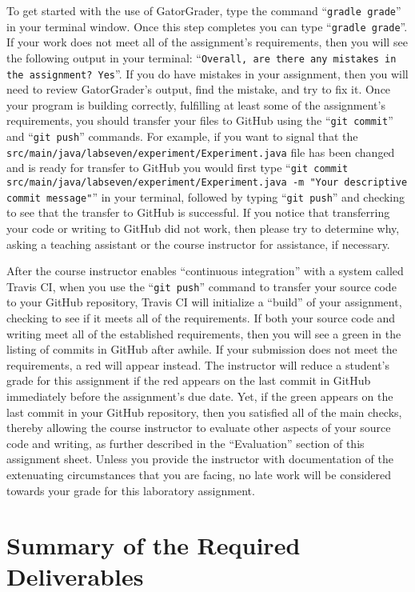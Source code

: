 \documentclass[11pt]{article}
\newcommand{\mainprogramsource}{\lstinline{src/main/java/labseven/experiment/Experiment.java}}
\newcommand{\gatorgraderstart}{\command{gradle grade}}
\newcommand{\gatorgradercheck}{\command{gradle grade}}
\newcommand{\gitcommit}{\command{git commit}}
\newcommand{\gitpush}{\command{git push}}
\newcommand{\gitcommitmainprogram}{\command{git commit src/main/java/labseven/experiment/Experiment.java -m "Your
descriptive commit message"}}
\newcommand{\command}[1]{``\lstinline{#1}''}
\newcommand{\step}[1]{``{#1}''}
\newcommand{\checkmark}{\ding{51}}
\newcommand{\naughtmark}{\ding{55}}
\begin{document}
To get started with the use of GatorGrader, type the command \gatorgraderstart{}
in your terminal window. Once this step completes you can type
\gatorgradercheck{}. If your work does not meet all of the assignment's
requirements, then you will see the following output in your terminal:
\command{Overall, are there any mistakes in the assignment? Yes}. If you do have
mistakes in your assignment, then you will need to review GatorGrader's output,
find the mistake, and try to fix it. Once your program is building correctly,
fulfilling at least some of the assignment's requirements, you should transfer
your files to GitHub using the \gitcommit{} and \gitpush{} commands. For
example, if you want to signal that the \mainprogramsource{} file has been
changed and is ready for transfer to GitHub you would first type
\gitcommitmainprogram{} in your terminal, followed by typing \gitpush{} and
checking to see that the transfer to GitHub is successful. If you notice that
transferring your code or writing to GitHub did not work, then please try to
determine why, asking a teaching assistant or the course instructor for
assistance, if necessary.

After the course instructor enables \step{continuous integration} with a system called Travis CI, when you use the
\gitpush{} command to transfer your source code to your GitHub repository, Travis CI will initialize a \step{build} of
your assignment, checking to see if it meets all of the requirements. If both your source code and writing meet all of
the established requirements, then you will see a green \checkmark{} in the listing of commits in GitHub after awhile.
If your submission does not meet the requirements, a red \naughtmark{} will appear instead. The instructor will reduce a
student's grade for this assignment if the red \naughtmark{} appears on the last commit in GitHub immediately before the
assignment's due date. Yet, if the green \checkmark{} appears on the last commit in your GitHub repository, then you
satisfied all of the main checks, thereby allowing the course instructor to evaluate other aspects of your source code
and writing, as further described in the \step{Evaluation} section of this assignment sheet. Unless you provide the
instructor with documentation of the extenuating circumstances that you are facing, no late work will be considered
towards your grade for this laboratory assignment.

\section*{Summary of the Required Deliverables}
\end{document}
